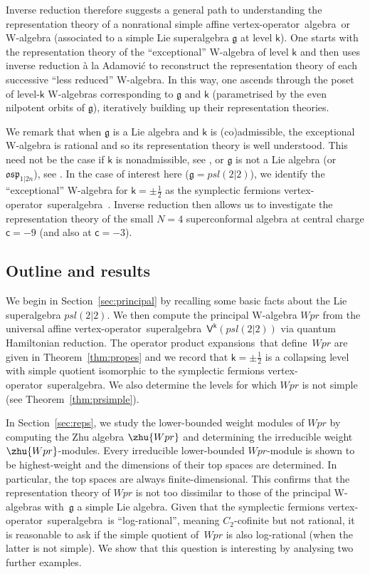 \documentclass[10pt,a4paper]{amsart}
\numberwithin{equation}{section}
\newcommand{\cc}{\mathsf{c}} %
\newcommand{\kk}{\mathsf{k}} %
\newcommand{\alg}[1]{\mathfrak{#1}} %
\newcommand{\VOA}[1]{\mathsf{#1}} %
\newcommand{\SLSA}[3]{\alg{#1}_{#2 \vert #3}} %
\newcommand{\psl}{\SLSA{psl}{2}{2}}
\newcommand{\uaff}[2]{\VOA{V}^{#1}(#2)} %
\newcommand{\upsl}[1][\kk]{\uaff{#1}{\psl}} %
\newcommand{\uwalg}[2]{\VOA{W}^{#1}_{\mathrm{#2}}} %
\newcommand{\upr}[1][\kk]{\uwalg{#1}{pr}} %
\newcommand{\fdim}{finite-dimensional}
\newcommand{\vo}{vertex-operator}
\newcommand{\voa}{\vo\ algebra}
\newcommand{\svoa}{\vo\ superalgebra}
\newcommand{\ope}{operator product expansion}
\newcommand{\opes}{\ope s}
\def\smash#1{#1}
\def\psl{psl(2|2)}
\def\upr{Wpr}
\begin{document}
Inverse reduction therefore suggests a general path to understanding the representation theory of a nonrational simple affine \voa\ or W-algebra (associated to a simple Lie superalgebra $\alg{g}$ at level $\kk$).
One starts with the representation theory of the ``exceptional'' W-algebra of level $\kk$ \cite{AraRat19} and then uses inverse reduction \`{a} la Adamovi\'{c} to reconstruct the representation theory of each successive ``less reduced'' W-algebra.
In this way, one ascends through the poset of level-$\kk$ W-algebras corresponding to $\alg{g}$ and $\kk$ (parametrised by the even nilpotent orbits of $\alg{g}$), iteratively building up their representation theories.

We remark that when $\alg{g}$ is a Lie algebra and $\kk$ is (co)admissible, the exceptional W-algebra is rational \cite{AraRat19} and so its representation theory is well understood.
This need not be the case if $\kk$ is nonadmissible, see \cite[Section~5.2]{AdaWei23}, or $\alg{g}$ is not a Lie algebra (or $\SLSA{osp}{1}{2n}$), see \cite{CreSL225}.
In the case of interest here ($\alg{g} = \psl$), we identify the ``exceptional'' W-algebra for $\kk = \pm \frac{1}{2}$ as the symplectic fermions \svoa\ \cite{KauSym00}.
Inverse reduction then allows us to investigate the representation theory of the small $N=4$ superconformal algebra at central charge $\cc=-9$ (and also at $\cc=-3$).

\subsection{Outline and results}

We begin in Section~\ref{sec:principal} by recalling some basic facts about the Lie superalgebra \smash{$\psl$}.
We then compute the principal W-algebra \smash{$\upr$} from the universal affine \vo\ superalgebra~\smash{$\upsl$} via quantum Hamiltonian reduction.
The \opes\ that define~$\upr$ are given in Theorem~\ref{thm:propes} and we record that \smash{$\kk=\pm\frac{1}{2}$} is a collapsing level with simple quotient isomorphic to the symplectic fermions \svoa.
We also determine the levels for which \smash{$\upr$} is not simple (see Theorem~\ref{thm:prsimple}).

In Section~\ref{sec:reps}, we study the lower-bounded weight modules of \smash{$\upr$} by computing the Zhu algebra \smash{$\zhu{\upr}$} and determining the irreducible weight \smash{$\zhu{\upr}$}-modules.
Every irreducible lower-bounded \smash{$\upr$}-module is shown to be highest-weight and the dimensions of their top spaces are determined.
In particular, the top spaces are always \fdim.
This confirms that the representation theory of \smash{$\upr$} is not too dissimilar to those of the principal W-algebras with~$\alg{g}$ a simple Lie algebra.
Given that the symplectic fermions \svoa\ is ``log-rational'', meaning $C_2$-cofinite but not rational, it is reasonable to ask if the simple quotient of~$\upr$ is also log-rational (when the latter is not simple).
We show that this question is interesting by analysing two further examples.
\end{document}
